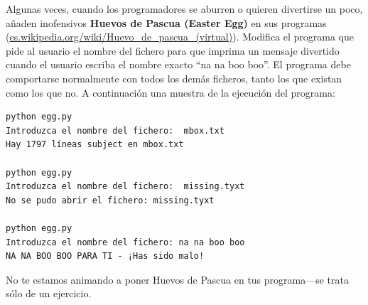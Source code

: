 \begin{ex}
Algunas veces, cuando los programadores se aburren o quieren divertirse un poco,
añaden inofensivos {\bf Huevos de Pascua (Easter Egg)} en sus programas
(\url{es.wikipedia.org/wiki/Huevo_de_pascua_(virtual)}). Modifica el programa
que pide al usuario el nombre del fichero para que imprima un mensaje
divertido cuando el usuario escriba el nombre exacto ``na na boo boo''.
El programa debe comportarse normalmente con todos los demás ficheros,
tanto los que existan como los que no. A continuación una muestra de la ejecución
del programa:

\beforeverb
\begin{verbatim}
python egg.py 
Introduzca el nombre del fichero:  mbox.txt
Hay 1797 líneas subject en mbox.txt

python egg.py 
Introduzca el nombre del fichero:  missing.tyxt
No se pudo abrir el fichero: missing.tyxt

python egg.py 
Introduzca el nombre del fichero: na na boo boo
NA NA BOO BOO PARA TI - ¡Has sido malo!
\end{verbatim}
\afterverb
%
No te estamos animando a poner Huevos de Pascua en tus
programa---se trata sólo de un ejercicio.

\end{ex}

